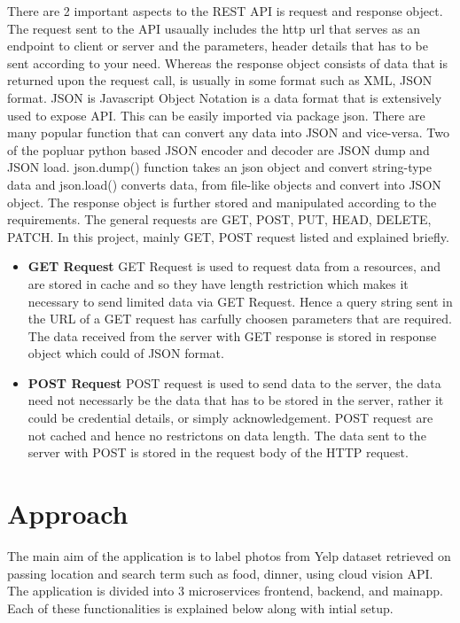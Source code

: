 There are 2 important aspects to the REST API is request and response
object. The request sent to the API usaually includes the http url
that serves as an endpoint to client or server and the parameters,
header details that has to be sent according to your need. Whereas the
response object consists of data that is returned upon the request
call, is usually in some format such as XML, JSON format. JSON is
Javascript Object Notation is a data format that is extensively used
to expose API. This can be easily imported via package json. There are
many popular function that can convert any data into JSON and
vice-versa. Two of the popluar python based JSON encoder and decoder
are JSON dump and JSON load. json.dump() function takes an json object
and convert string-type data and json.load() converts data, from
file-like objects and convert into JSON object. The response object is
further stored and manipulated according to the requirements. The
general requests are GET, POST, PUT, HEAD, DELETE, PATCH. In this
project, mainly GET, POST request listed and explained briefly.

\begin{itemize}
\item \textbf{GET Request} GET Request is used to request data from a
  resources, and are stored in cache and so they have length
  restriction which makes it necessary to send limited data via GET
  Request. Hence a query string sent in the URL of a GET request has
  carfully choosen parameters that are required. The data received
  from the server with GET response is stored in response object which
  could of JSON format.
  
\item \textbf{POST Request} POST request is used to send data to the
  server, the data need not necessarly be the data that has to be
  stored in the server, rather it could be credential details, or
  simply acknowledgement. POST request are not cached and hence no
  restrictons on data length. The data sent to the server with POST is
  stored in the request body of the HTTP request.
  
\end{itemize}

\section{Approach}

The main aim of the application is to label photos from Yelp dataset
retrieved on passing location and search term such as food, dinner,
using cloud vision API. The application is divided into 3
microservices frontend, backend, and mainapp. Each of these
functionalities is explained below along with intial setup.

